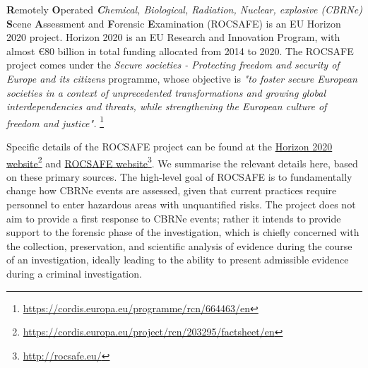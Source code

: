 \textbf{R}emotely \textbf{O}perated \textit{\textbf{C}hemical, Biological, Radiation, Nuclear, explosive (CBRNe)} \textbf{S}cene \textbf{A}ssessment and \textbf{F}orensic \textbf{E}xamination (ROCSAFE) is an EU Horizon 2020 project. Horizon 2020 is an EU Research and Innovation Program, with almost €80 billion in total funding allocated from 2014 to 2020. The ROCSAFE project comes under the \textit{Secure societies - Protecting freedom and security of Europe and its citizens} programme, whose objective is \textit{"to foster secure European societies in a context of unprecedented transformations and growing global interdependencies and threats, while strengthening the European culture of freedom and justice".}
\href{https://cordis.europa.eu/programme/rcn/664463/en}{ }\footnote{\href {https://cordis.europa.eu/programme/rcn/664463/en}{https://cordis.europa.eu/programme/rcn/664463/en}}

Specific details of the ROCSAFE project can be found at the \href{https://cordis.europa.eu/project/rcn/203295/factsheet/en}{Horizon 2020 website}\footnote{\href {https://cordis.europa.eu/project/rcn/203295/factsheet/en}{https://cordis.europa.eu/project/rcn/203295/factsheet/en}} 
and 
\href{http://rocsafe.eu/}{ROCSAFE website}\footnote{\href {http://rocsafe.eu/}{http://rocsafe.eu/}}. We summarise the relevant details here, based on these primary sources. The high-level goal of ROCSAFE is to fundamentally change how CBRNe events are assessed, given that current practices require personnel to enter hazardous areas with unquantified risks. The project does not aim to provide a first response to CBRNe events; rather it intends to provide support to the forensic phase of the investigation, which is chiefly concerned with the collection, preservation, and scientific analysis of evidence during the course of an investigation, ideally leading to the ability to present admissible evidence during a criminal investigation. 


